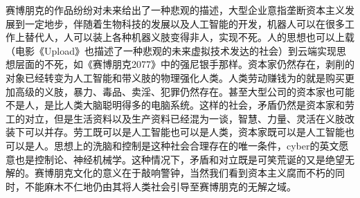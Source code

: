 \documentclass{ctexart}
\begin{document}
赛博朋克的作品纷纷对未来给出了一种悲观的描述，大型企业意指垄断资本主义发展到一定地步，伴随着生物科技的发展以及人工智能的开发，机器人可以在很多工作上替代人，人可以装上各种机器义肢变得非人，实现不死。人的思想也可以上载（电影《Upload》也描述了一种悲观的未来虚拟技术发达的社会）到云端实现思想层面的不死，如《赛博朋克2077》中的强尼银手那样。资本家仍然存在，剥削的对象已经转变为人工智能和带义肢的物理强化人类。人类劳动赚钱为的就是购买更加高级的义肢，暴力、毒品、卖淫、犯罪仍然存在。甚至大型公司的资本家也可能不是人，是比人类大脑聪明得多的电脑系统。这样的社会，矛盾仍然是资本家和劳工的对立，但是生活资料以及生产资料已经混为一谈，智慧、力量、灵活在义肢改装下可以并存。劳工既可以是人工智能也可以是人类，资本家既可以是人工智能也可以是人。思想上的洗脑和控制是这种社会合理存在的唯一条件，cyber的英文愿意也是控制论、神经机械学。这种情况下，矛盾和对立既是可笑荒诞的又是绝望无解的。赛博朋克文化的意义在于敲响警钟，当然我们看到资本主义腐而不朽的同时，不能麻木不仁地仍由其将人类社会引导至赛博朋克的无解之域。





\end{document}

